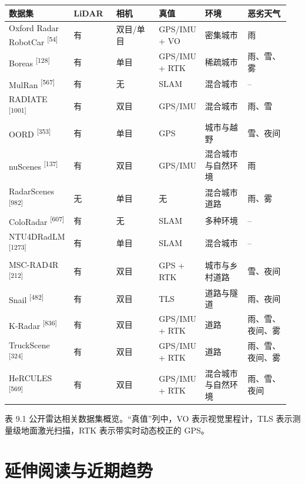 \small
\setlength{\tabcolsep}{2pt}
\begin{center}
\begin{tabular}{p{0.158\linewidth}p{0.158\linewidth}p{0.158\linewidth}p{0.158\linewidth}p{0.158\linewidth}p{0.158\linewidth}}
\toprule
数据集 & LiDAR & 相机 & 真值 & 环境 & 恶劣天气 \\
\midrule
Oxford Radar RobotCar \textsuperscript{[54]} & 有 & 双目/单目 & GPS/IMU + VO & 密集城市 & 雨 \\
Boreas \textsuperscript{[128]} & 有 & 单目 & GPS/IMU + RTK & 稀疏城市 & 雨、雪、雾 \\
MulRan \textsuperscript{[567]} & 有 & 无 & SLAM & 混合城市 & -- \\
RADIATE \textsuperscript{[1001]} & 有 & 双目 & GPS/IMU & 混合城市 & 雨、雪 \\
OORD \textsuperscript{[353]} & 有 & 单目 & GPS & 城市与越野 & 雪、夜间 \\
nuScenes \textsuperscript{[137]} & 有 & 双目 & GPS/IMU & 混合城市与自然环境 & 雨 \\
RadarScenes \textsuperscript{[982]} & 无 & 单目 & 无 & 混合城市道路 & 雨、雾 \\
ColoRadar \textsuperscript{[607]} & 有 & 无 & SLAM & 多种环境 & -- \\
NTU4DRadLM \textsuperscript{[1273]} & 有 & 单目 & SLAM & 混合城市 & -- \\
MSC-RAD4R \textsuperscript{[212]} & 有 & 双目 & GPS + RTK & 城市与乡村道路 & 雪、夜间 \\
Snail \textsuperscript{[482]} & 有 & 双目 & TLS & 道路与隧道 & 雨、夜间 \\
K-Radar \textsuperscript{[836]} & 有 & 双目 & GPS/IMU + RTK & 道路 & 雨、雪、夜间、雾 \\
TruckScene \textsuperscript{[324]} & 有 & 双目 & GPS/IMU + RTK & 道路 & 雨、雪、夜间、雾 \\
HeRCULES \textsuperscript{[569]} & 有 & 双目 & GPS/IMU + RTK & 混合城市与自然环境 & 雨、雪、夜间 \\
\bottomrule
\end{tabular}
\end{center}

表 9.1 公开雷达相关数据集概览。“真值”列中，VO 表示视觉里程计，TLS 表示测量级地面激光扫描，RTK 表示带实时动态校正的 GPS。

\section{延伸阅读与近期趋势}

